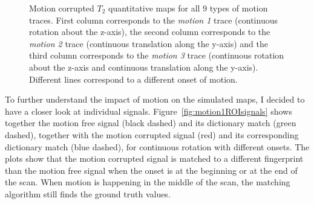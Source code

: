 \begin{figure}[ht]
    \caption{Motion corrupted $T_2$ quantitative maps for all 9 types of motion traces. First column corresponds to the \textit{motion 1} trace (continuous rotation about the z-axis), the second column corresponds to the \textit{motion 2} trace (continuous translation along the y-axis) and the third column corresponds to the \textit{motion 3} trace (continuous rotation about the z-axis and continuous translation along the y-axis). Different lines correspond to a different onset of motion.}
    \label{fig:T2mapsmotion}
\end{figure}



To further understand the impact of motion on the simulated maps, I decided to have a closer look at individual signals. 
Figure~\ref{fig:motion1ROIsignals} shows together the motion free signal (black dashed) and its dictionary match (green dashed), together with the motion corrupted signal (red) and its corresponding dictionary match (blue dashed), for continuous rotation with different onsets.
The plots show that the motion corrupted signal is matched to a different fingerprint than the motion free signal when the onset is at the beginning or at the end of the scan.
When motion is happening in the middle of the scan, the matching algorithm still finds the ground truth values.

